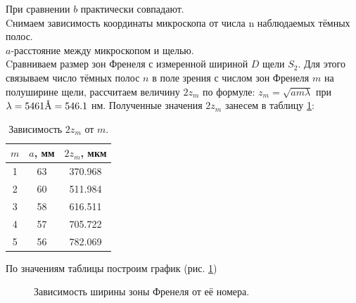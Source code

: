 \documentclass[a4paper, 12pt]{article}
\newcommand{\angstrom}{\textup{\AA}}
\begin{document}
	При сравнении $b$ практически совпадают.\\
	Cнимаем зависимость координаты микроскопа от числа n наблюдаемых тёмных полос.\\
	$a$-расстояние между микроскопом и щелью.\\
	Cравниваем размер зон Френеля с измеренной шириной $D$ щели $S_2$. Для этого связываем число тёмных полос $n$ в поле зрения с числом зон Френеля $m$ на полуширине щели, рассчитаем величину $2z_m$ по формуле: $z_m=\sqrt{am\lambda}$ при $\lambda=5461 \angstrom = 546.1$ нм. Полученные значения $2z_m$ занесем в таблицу \ref{tab:1}:\\
	\begin{table}[h]
		\centering
		\begin{tabular}{|c|c|c|}
			\hline
			$m$ & $a$, мм & $2z_m$, мкм\\
			\hline
			1 & 63 & 370.968\\
			2 & 60 & 511.984\\
			3 & 58 & 616.511\\
			4 & 57 & 705.722\\
			5 & 56 & 782.069\\
			\hline
		\end{tabular}
		\caption{Зависимость $2z_m$ от $m$.}
		\label{tab:1}
	\end{table}
	По значениям таблицы построим график (рис. \ref{graph1:1})
	\begin{figure}
		\caption{Зависимость ширины зоны Френеля от её номера.}
		\label{graph1:1}
	\end{figure}
\end{document}
